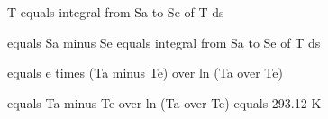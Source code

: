 T equals integral from Sa to Se of T ds

equals Sa minus Se equals integral from Sa to Se of T ds

equals e times (Ta minus Te) over ln (Ta over Te)

equals Ta minus Te over ln (Ta over Te) equals 293.12 K